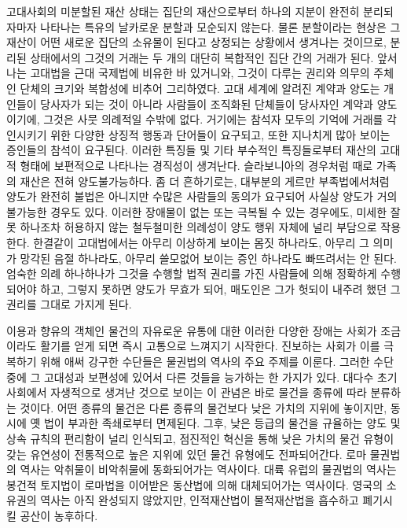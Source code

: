 고대사회의 미분할된 재산 상태는
집단의 재산으로부터 하나의 지분이 완전히 분리되자마자 나타나는
특유의 날카로운 분할과 모순되지 않는다.
물론 분할이라는 현상은
그 재산이 어떤 새로운 집단의 소유물이 된다고 상정되는 상황에서
생겨나는 것이므로,
분리된 상태에서의 그것의 거래는
두 개의 대단히 복합적인 집단 간의 거래가 된다.
앞서 나는 고대법을 근대 국제법에 비유한 바 있거니와,
그것이 다루는 권리와 의무의 주체인 단체의 크기와 복합성에 비추어 그리하였다.
고대 세계에 알려진 계약과 양도는
개인들이 당사자가 되는 것이 아니라
사람들이 조직화된 단체들이 당사자인 계약과 양도이기에,
그것은 사뭇 의례적일 수밖에 없다.
거기에는
참석자 모두의 기억에 거래를 각인시키기 위한
다양한 상징적 행동과 단어들이 요구되고,
또한 지나치게 많아 보이는 증인들의 참석이 요구된다.
이러한 특징들 및 기타 부수적인 특징들로부터
재산의 고대적 형태에 보편적으로 나타나는 경직성이 생겨난다.
슬라보니아의 경우처럼
때로 가족의 재산은 전혀 양도불가능하다.
좀 더 흔하기로는,
대부분의 게르만 부족법에서처럼
양도가 완전히 불법은 아니지만
수많은 사람들의 동의가 요구되어
사실상 양도가 거의 불가능한 경우도 있다.
이러한 장애물이 없는
또는 극복될 수 있는 경우에도,
미세한 잘못 하나조차 허용하지 않는 철두철미한 의례성이
양도 행위 자체에 널리 부담으로 작용한다.
한결같이
고대법에서는
아무리 이상하게 보이는 몸짓 하나라도,
아무리 그 의미가 망각된 음절 하나라도,
아무리 쓸모없어 보이는 증인 하나라도
빠뜨려서는 안 된다.
엄숙한 의례 하나하나가
그것을 수행할 법적 권리를 가진 사람들에 의해
정확하게 수행되어야 하고,
그렇지 못하면
양도가 무효가 되어,
매도인은 그가 헛되이 내주려 했던 그 권리를 그대로 가지게 된다.

이용과 향유의 객체인 물건의 자유로운 유통에 대한 이러한 다양한 장애는
사회가 조금이라도 활기를 얻게 되면 즉시
고통으로 느껴지기 시작한다.
진보하는 사회가 이를 극복하기 위해 애써 강구한 수단들은
물권법의 역사의 주요 주제를 이룬다.
그러한 수단 중에
그 고대성과 보편성에 있어서 다른 것들을 능가하는 한 가지가 있다.
대다수 초기 사회에서 자생적으로 생겨난 것으로 보이는 이 관념은
바로 물건을 종류에 따라 분류하는 것이다.
어떤 종류의 물건은 다른 종류의 물건보다 낮은 가치의 지위에 놓이지만,
동시에 옛 법이 부과한 족쇄로부터 면제된다.
그후,
낮은 등급의 물건을 규율하는 양도 및 상속 규칙의 편리함이
널리 인식되고,
점진적인 혁신을 통해 낮은 가치의 물건 유형이 갖는 유연성이
전통적으로 높은 지위에 있던 물건 유형에도 전파되어간다.
로마 물권법의 역사는 악취물이
비악취물에 동화되어가는
역사이다.
대륙 유럽의 물권법의 역사는
봉건적 토지법이 로마법을 이어받은 동산법에 의해
대체되어가는 역사이다.
영국의 소유권의 역사는 아직 완성되지 않았지만,
인적재산법이
물적재산법을
흡수하고 폐기시킬 공산이
농후하다.


